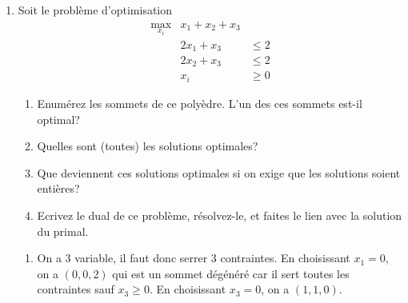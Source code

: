 \begin{enumerate}
  \item Soit le problème d'optimisation
    \begin{eqnarray*}
      \max_{x_i} & x_1+ x_2+ x_3 &  \\
      &2 x_1 + x_3  &\leq 2 \\
      &2 x_2 + x_3  &\leq 2 \\
      &x_i &\geq 0
    \end{eqnarray*}

    \begin{enumerate}
      \item Enumérez les sommets de ce polyèdre. L'un des
        ces sommets est-il optimal?
      \item Quelles sont (toutes) les
        solutions optimales?
      \item Que deviennent ces solutions optimales si
        on exige que les solutions soient entières?
      \item Ecrivez le dual de
        ce problème, résolvez-le, et faites le lien avec la solution du
        primal.
    \end{enumerate}

    \begin{solution}
      \begin{enumerate}
        \item On a 3 variable, il faut donc serrer 3 contraintes.
          En choisissant $x_1 = 0$, on a $(0, 0, 2)$ qui est un sommet
          dégénéré car il sert toutes les contraintes sauf $x_3 \geq 0$.
          En choisissant $x_3 = 0$, on a $(1, 1, 0)$.


\end{enumerate}
\end{solution}
\end{enumerate}

